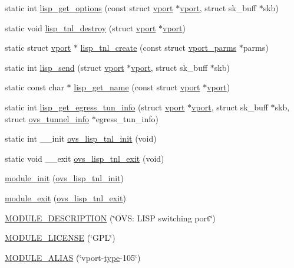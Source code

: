 \begin{DoxyCompactItemize}
\item 
static int \hyperlink{linux_2vport-lisp_8c_a54dce33d8291b4f7f816d882b13c3cc3}{lisp\+\_\+get\+\_\+options} (const struct \hyperlink{structvport}{vport} $\ast$\hyperlink{structvport}{vport}, struct sk\+\_\+buff $\ast$skb)
\item 
static void \hyperlink{linux_2vport-lisp_8c_a29757c9680cfc5547ff8b58fc9d39f57}{lisp\+\_\+tnl\+\_\+destroy} (struct \hyperlink{structvport}{vport} $\ast$\hyperlink{structvport}{vport})
\item 
static struct \hyperlink{structvport}{vport} $\ast$ \hyperlink{linux_2vport-lisp_8c_aeaf8548971b28354b0c5b67853008ebb}{lisp\+\_\+tnl\+\_\+create} (const struct \hyperlink{structvport__parms}{vport\+\_\+parms} $\ast$parms)
\item 
static int \hyperlink{linux_2vport-lisp_8c_a3a50252974d93009f1c1204799ef7ba0}{lisp\+\_\+send} (struct \hyperlink{structvport}{vport} $\ast$\hyperlink{structvport}{vport}, struct sk\+\_\+buff $\ast$skb)
\item 
static const char $\ast$ \hyperlink{linux_2vport-lisp_8c_a9b17408cfe8b9c4999729e709eda60c8}{lisp\+\_\+get\+\_\+name} (const struct \hyperlink{structvport}{vport} $\ast$\hyperlink{structvport}{vport})
\item 
static int \hyperlink{linux_2vport-lisp_8c_a38f0b18b384c833b501a23e942fa2a07}{lisp\+\_\+get\+\_\+egress\+\_\+tun\+\_\+info} (struct \hyperlink{structvport}{vport} $\ast$\hyperlink{structvport}{vport}, struct sk\+\_\+buff $\ast$skb, struct \hyperlink{structovs__tunnel__info}{ovs\+\_\+tunnel\+\_\+info} $\ast$egress\+\_\+tun\+\_\+info)
\item 
static int \+\_\+\+\_\+init \hyperlink{linux_2vport-lisp_8c_a2796063074f5d672bb389e375b744a7f}{ovs\+\_\+lisp\+\_\+tnl\+\_\+init} (void)
\item 
static void \+\_\+\+\_\+exit \hyperlink{linux_2vport-lisp_8c_ad76ba8664a548e29a850c62273297c6d}{ovs\+\_\+lisp\+\_\+tnl\+\_\+exit} (void)
\item 
\hyperlink{linux_2vport-lisp_8c_a94a5f96f1e47f7598c585bbf70bfe00f}{module\+\_\+init} (\hyperlink{vport-lisp_8c_a2796063074f5d672bb389e375b744a7f}{ovs\+\_\+lisp\+\_\+tnl\+\_\+init})
\item 
\hyperlink{linux_2vport-lisp_8c_a4ead3dc5abdbbff6d567af19f9eec979}{module\+\_\+exit} (\hyperlink{vport-lisp_8c_ad76ba8664a548e29a850c62273297c6d}{ovs\+\_\+lisp\+\_\+tnl\+\_\+exit})
\item 
\hyperlink{linux_2vport-lisp_8c_aa7521a419702060baceb5ba5fc1ec8c7}{M\+O\+D\+U\+L\+E\+\_\+\+D\+E\+S\+C\+R\+I\+P\+T\+I\+O\+N} (\char`\"{}O\+V\+S\+: L\+I\+S\+P switching port\char`\"{})
\item 
\hyperlink{linux_2vport-lisp_8c_ad94b36675e7eb067ea3ce6ff9e244a44}{M\+O\+D\+U\+L\+E\+\_\+\+L\+I\+C\+E\+N\+S\+E} (\char`\"{}G\+P\+L\char`\"{})
\item 
\hyperlink{linux_2vport-lisp_8c_a8b3ea9759357bb282812b0925b450fa1}{M\+O\+D\+U\+L\+E\+\_\+\+A\+L\+I\+A\+S} (\char`\"{}vport-\/\hyperlink{flow_8h_ab22aaab04f806700def00f32823fcb9e}{type}-\/105\char`\"{})
\end{DoxyCompactItemize}


